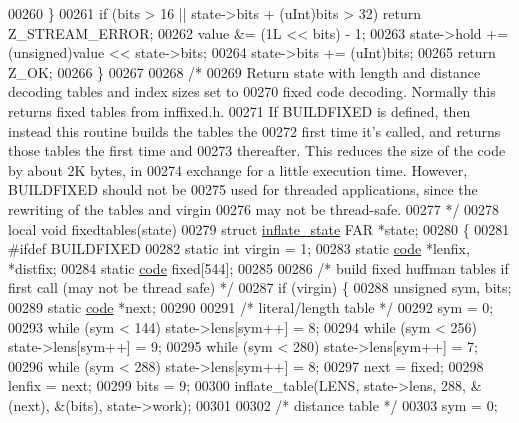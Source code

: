 \begin{DoxyCode}
00260     \}
00261     \textcolor{keywordflow}{if} (bits > 16 || state->bits + (uInt)bits > 32) \textcolor{keywordflow}{return} Z\_STREAM\_ERROR;
00262     value &= (1L << bits) - 1;
00263     state->hold += (unsigned)value << state->bits;
00264     state->bits += (uInt)bits;
00265     \textcolor{keywordflow}{return} Z\_OK;
00266 \}
00267 
00268 \textcolor{comment}{/*}
00269 \textcolor{comment}{   Return state with length and distance decoding tables and index sizes set to}
00270 \textcolor{comment}{   fixed code decoding.  Normally this returns fixed tables from inffixed.h.}
00271 \textcolor{comment}{   If BUILDFIXED is defined, then instead this routine builds the tables the}
00272 \textcolor{comment}{   first time it's called, and returns those tables the first time and}
00273 \textcolor{comment}{   thereafter.  This reduces the size of the code by about 2K bytes, in}
00274 \textcolor{comment}{   exchange for a little execution time.  However, BUILDFIXED should not be}
00275 \textcolor{comment}{   used for threaded applications, since the rewriting of the tables and virgin}
00276 \textcolor{comment}{   may not be thread-safe.}
00277 \textcolor{comment}{ */}
00278 local \textcolor{keywordtype}{void} fixedtables(state)
00279 \textcolor{keyword}{struct }\hyperlink{structinflate__state}{inflate\_state} FAR *state;
00280 \{
00281 \textcolor{preprocessor}{#ifdef BUILDFIXED}
00282     \textcolor{keyword}{static} \textcolor{keywordtype}{int} virgin = 1;
00283     \textcolor{keyword}{static} \hyperlink{structcode}{code} *lenfix, *distfix;
00284     \textcolor{keyword}{static} \hyperlink{structcode}{code} fixed[544];
00285 
00286     \textcolor{comment}{/* build fixed huffman tables if first call (may not be thread safe) */}
00287     \textcolor{keywordflow}{if} (virgin) \{
00288         \textcolor{keywordtype}{unsigned} sym, bits;
00289         \textcolor{keyword}{static} \hyperlink{structcode}{code} *next;
00290 
00291         \textcolor{comment}{/* literal/length table */}
00292         sym = 0;
00293         \textcolor{keywordflow}{while} (sym < 144) state->lens[sym++] = 8;
00294         \textcolor{keywordflow}{while} (sym < 256) state->lens[sym++] = 9;
00295         \textcolor{keywordflow}{while} (sym < 280) state->lens[sym++] = 7;
00296         \textcolor{keywordflow}{while} (sym < 288) state->lens[sym++] = 8;
00297         next = fixed;
00298         lenfix = next;
00299         bits = 9;
00300         inflate\_table(LENS, state->lens, 288, &(next), &(bits), state->work);
00301 
00302         \textcolor{comment}{/* distance table */}
00303         sym = 0;

\end{DoxyCode}
